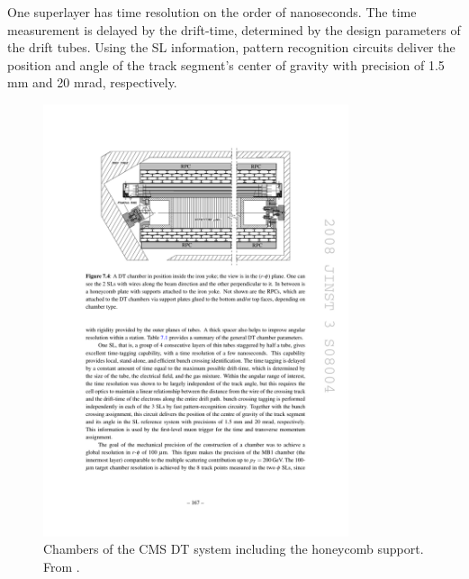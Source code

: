 One superlayer has time resolution on the order of nanoseconds.
The time measurement is delayed by the drift-time, determined by the design parameters of the drift tubes.
Using the SL information, pattern recognition circuits deliver the position and angle 
of the track segment's center of gravity with precision of 1.5 mm and 20 mrad, respectively.

\begin{figure}[hbtp]
\centering
\includegraphics[width=0.80\textwidth]{figures/cms_muonsystem_honeycomb.pdf}
\caption{Chambers of the CMS DT system including the honeycomb support. From \cite{Chatrchyan:2008aa}.}
\label{fig:dt_chambers}
\end{figure}

